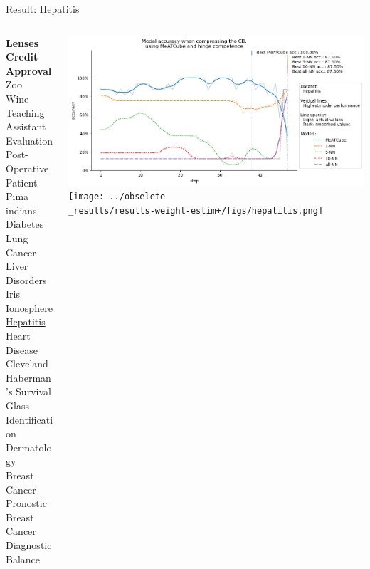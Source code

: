 \documentclass[]{beamer}
\begin{document}
\begin{frame}{Result: Hepatitis}
    \begin{columns}
        \begin{column}{.3\textwidth}
            {\smaller\smaller\smaller
            \textbf{Lenses} \\
            \textbf{Credit Approval} \\
            Zoo \\
            Wine \\
            Teaching Assistant Evaluation \\
            Post-Operative Patient \\
            Pima indians Diabetes \\
            Lung Cancer \\
            Liver Disorders \\
            Iris \\
            Ionosphere \\
            \underline{Hepatitis} \\
            Heart Disease Cleveland \\
            Haberman's Survival \\
            Glass Identification \\
            Dermatology \\
            Breast Cancer Pronostic \\
            Breast Cancer Diagnostic \\
            Balance\\
            ~}
        \end{column}
        \begin{column}{.7\textwidth}
            \includegraphics[width=\textwidth]{../results-no-sim-tuning+/figs/hepatitis.png}
            \texttt{[image: ../obselete\\\_results/results-weight-estim+/figs/hepatitis.png]}
        \end{column}
    \end{columns}
\end{frame}
\end{document}
